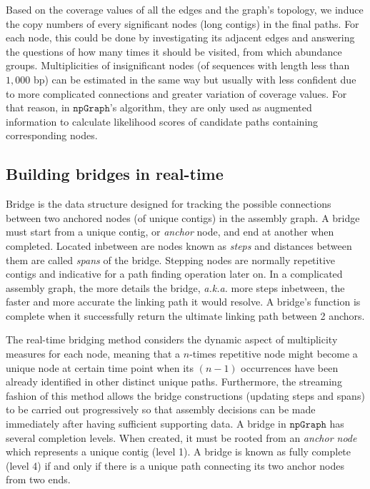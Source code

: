 \documentclass[10pt,twocolumn,twoside]{genpaper}
\newcommand{\npgraph}{$\mathtt{npGraph}$}
\begin{document}
Based on the coverage values of all the edges and the graph's topology, we induce the copy numbers of every significant nodes (long contigs) in the final paths.
For each node, this could be done by investigating its adjacent edges and answering the questions of how many times it should be visited, from which abundance groups.
Multiplicities of insignificant nodes (of sequences with length less than $1,000$ bp) can be estimated in the same way but usually with less confident due to more complicated connections and greater variation of coverage values. 
For that reason, in \npgraph{}'s algorithm, they are only used as augmented information to calculate likelihood scores of candidate paths containing corresponding nodes.

\subsection*{Building bridges in real-time}
Bridge is the data structure designed for tracking the possible connections between two anchored nodes (of unique contigs) in the assembly graph.
A bridge must start from a unique contig, or \emph{anchor} node, and end at another when completed. Located inbetween are nodes known as \emph{steps} and distances between them are called \emph{spans} of the bridge. Stepping nodes are normally repetitive contigs and indicative for a path finding operation later on. In a complicated assembly graph, the more details the bridge, \emph{a.k.a.} more steps inbetween, the faster and more accurate the linking path it would resolve. A bridge's function is complete when it successfully return the ultimate linking path between 2 anchors.

The real-time bridging method considers the dynamic aspect of multiplicity measures for each node, meaning that a $n$-times repetitive node might become a unique node at certain time point when its $(n-1)$ occurrences have been already identified in other distinct unique paths. 
Furthermore, the streaming fashion of this method allows the bridge constructions (updating steps and spans) to be carried out progressively so that assembly decisions can be made immediately after having sufficient supporting data.
A bridge in \npgraph{} has several completion levels. When created, it must be rooted from an \emph{anchor node} which represents a unique contig (level 1). A bridge is known as fully complete (level 4) if and only if there is a unique path connecting its two anchor nodes from two ends. 
\end{document}
